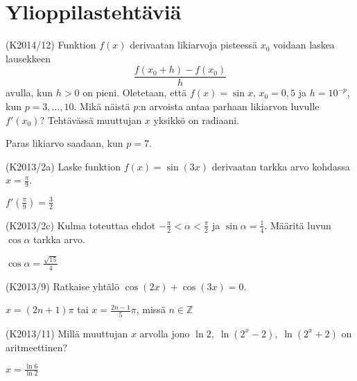 \section{Ylioppilastehtäviä}

\begin{tehtava} (K2014/12)
	Funktion $f(x)$ derivaatan likiarvoja pisteessä $x_0$ voidaan laskea lausekkeen 
	\[\frac{f(x_0+h)-f(x_0)}{h}\] avulla, kun $h>0$ on pieni. Oletetaan, että $f(x)=\sin x$, 
	$x_0=0,5$ ja $h=10^{-p}$, kun $p=3,\ldots,10$. Mikä näistä $p$:n arvoista antaa parhaan 
	likiarvon luvulle $f'(x_0)$? Tehtävässä muuttujan $x$ yksikkö on radiaani.
		\begin{vastaus}
			Paras likiarvo saadaan, kun $p=7$. 
		\end{vastaus}
\end{tehtava}

\begin{tehtava} (K2013/2a)
	Laske funktion $f(x)=\sin(3x)$ derivaatan tarkka arvo kohdassa $x=\frac{\pi}{9}$.
		\begin{vastaus}
			$f'(\frac{\pi}{9})=\frac{3}{2}$
		\end{vastaus}
\end{tehtava}

\begin{tehtava} (K2013/2c)
	Kulma \alpha toteuttaa ehdot $-\frac{\pi}{2}<\alpha<\frac{\pi}{2}$ ja $\sin\alpha=\frac{1}{4}$.
	Määritä luvun $\cos\alpha$ tarkka arvo.
		\begin{vastaus}
			$\cos\alpha=\frac{\sqrt{15}}{4}$
		\end{vastaus}
\end{tehtava}

\begin{tehtava} (K2013/9)
	Ratkaise yhtälö $\cos(2x)+\cos(3x)=0$.
		\begin{vastaus}
			$x=(2n+1)\pi$ tai $x=\frac{2n-1}{5}\pi$, missä $n\in\mathbb{Z}$
		\end{vastaus}
\end{tehtava}

\begin{tehtava} (K2013/11)
	Millä muuttujan $x$ arvolla jono $\ln2, \; \ln(2^x-2), \; \ln(2^x+2)$ on aritmeettinen?
		\begin{vastaus}
			$x=\frac{\ln6}{\ln2}$
		\end{vastaus}
\end{tehtava}

